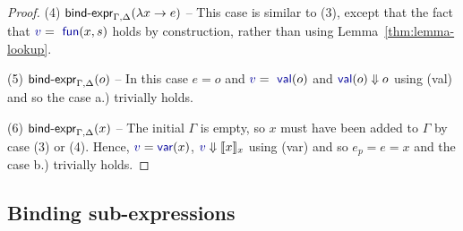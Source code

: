 \documentclass[english,submission]{programming}
\theoremstyle{plain}
\theoremstyle{definition}
\newcommand{\ident}[1]{\textnormal{\textcolor{idclr}{\sffamily #1}}}
\newcommand{\bndclr}[1]{\textcolor{kvdclr}{#1}}
\newcommand{\bnd}[1]{\textnormal{\textcolor{kvdclr}{\sffamily #1}}}
\newcommand{\rname}[1]{{\sffamily(#1)}}
\begin{document}
\begin{proof}
\vspace{0.75em}\noindent(4) $\ident{bind-expr}_{\Gamma, \Delta}(\lambda x\rightarrow e)$  --
  This case is similar to (3), except that the fact that $\bndclr{v} = \bnd{fun}(x, s)$
  holds by construction, rather than using Lemma~\ref{thm:lemma-lookup}.

\vspace{0.75em}\noindent(5) $\ident{bind-expr}_{\Gamma, \Delta}(o)$ -- In this case $e=o$ and $\bndclr{v} = \bnd{val}(o)$
  and $\bnd{val}(o)\Downarrow o$ using \rname{val} and so the case a.) trivially holds.

\vspace{0.75em}\noindent(6) $\ident{bind-expr}_{\Gamma, \Delta}(x)$ -- The initial $\Gamma$ is empty,
  so $x$ must have been added to $\Gamma$ by case (3) or (4). Hence,
  $\bndclr{v}=\bnd{var}(x)$, $\bndclr{v}\Downarrow \llbracket x \rrbracket_{x}$ using \rname{var}
  and so $e_p = e = x$ and the case b.) trivially holds.

\end{proof}

\subsection{Binding sub-expressions}
\label{sec:sub-expr}
\end{document}
